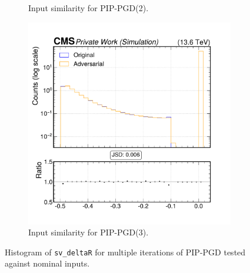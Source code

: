 \begin{figure}[htbp]
\begin{subfigure}[t]{0.32\textwidth}
    \caption*{Input similarity for PIP-PGD(2).}
  \end{subfigure}\hfill
  \begin{subfigure}[t]{0.32\textwidth}
    \includegraphics[width=\linewidth]{media/output/features/compare/combined_it_3/cmp_vtx_arr_sv_deltaR.pdf}
    \caption*{Input similarity for PIP-PGD(3).}
  \end{subfigure}

  \caption*{Histogram of \texttt{sv\_deltaR} for multiple iterations of PIP-PGD tested against nominal inputs.}
  \label{fig:combined_input_sv_deltaR}
\end{figure}

